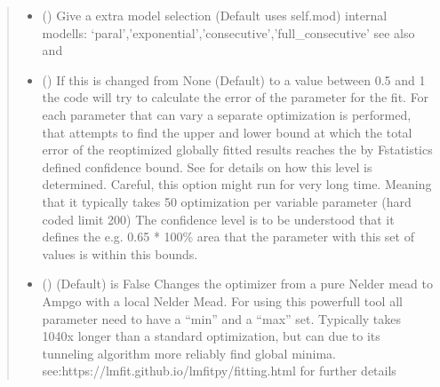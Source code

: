 \documentclass[letterpaper,10pt,english]{sphinxmanual}
\begin{document}
\begin{fulllineitems}
\begin{fulllineitems}
\begin{quote}
\begin{description}
\begin{itemize}
\item {} 
 (\sphinxstyleliteralemphasis{\sphinxupquote{, }}) \textendash{} Give a extra model selection (Default uses self.mod)
internal modells: ‘paral’,’exponential’,’consecutive’,’full\_consecutive’
see also {\hyperref[\detokenize{plot_func:plot_func.build_c}]{}} and {\hyperref[\detokenize{plot_func:plot_func.err_func}]{}}

\item {} 
 (\sphinxstyleliteralemphasis{\sphinxupquote{ (}}\sphinxstyleliteralemphasis{\sphinxupquote{)}}\sphinxstyleliteralemphasis{\sphinxupquote{, }}) \textendash{} If this is changed from None (Default) to a value between 0.5 and 1 the code will
try to calculate the error of the parameter for the fit. For each parameter that
can vary a separate optimization is     performed, that attempts to find the upper
and lower bound at which the total error of the re\sphinxhyphen{}optimized globally fitted results
reaches the by F\sphinxhyphen{}statistics defined confidence bound. See {\hyperref[\detokenize{plot_func:plot_func.s2_vs_smin2}]{}} for details
on how this level is determined. Careful, this option might run for very long time.
Meaning that it typically takes 50 optimization per variable parameter (hard coded limit 200)
The confidence level is to be understood that it defines the e.g. 0.65 * 100\% area that the
parameter with this set of values is within this bounds.

\item {} 
 (\sphinxstyleliteralemphasis{\sphinxupquote{, }}) \textendash{} (Default) is False
Changes the optimizer from a pure Nelder mead to Ampgo with a local Nelder Mead.
For using this powerfull tool all parameter need to have a “min” and a “max” set.
Typically takes 10\sphinxhyphen{}40x longer than a standard optimization, but can due to its
tunneling algorithm more reliably find global minima.
see:https://lmfit.github.io/lmfit\sphinxhyphen{}py/fitting.html for further details


\end{itemize}
\end{description}
\end{quote}
\end{fulllineitems}
\end{fulllineitems}
\end{document}
